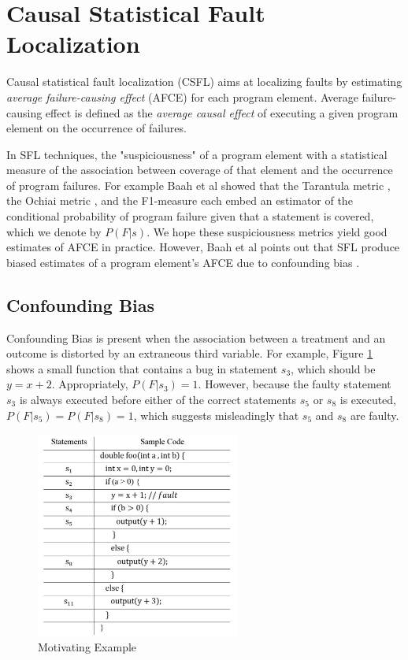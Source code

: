 \section{Causal Statistical Fault Localization}
Causal statistical fault localization (CSFL) aims at localizing faults by estimating {\it average failure-causing effect} (AFCE) for each program element. Average failure-causing effect is defined as the {\it average causal effect} \cite{pearl2000models} of executing a given program element on the occurrence of failures.  

In SFL techniques, the "suspiciousness" of a program element with a statistical measure of the association between coverage of that element and the occurrence of program failures. For example Baah et al showed \cite{baah2010causal} that the Tarantula metric \cite{jones2002visualization}, the Ochiai metric \cite{abreu2007accuracy}, and the F1-measure \cite{manning2008introduction} each embed an estimator of the conditional probability of program failure given that a statement  is covered, which we denote by $P(F|s)$.  We hope these suspiciousness metrics yield good estimates of AFCE in practice. However, Baah et al points out that SFL produce biased estimates of a program element’s AFCE due to confounding bias \cite{baah2010causal}.

\subsection{Confounding Bias}
Confounding Bias is present when the association between a treatment and an outcome is distorted by an extraneous third variable.  For example, Figure \ref{fig2.1} shows a small function that contains a bug in statement $s_3$, which should be $y=x+2$.  Appropriately, $P(F|s_3)=1$.  However, because the faulty statement $s_3$ is always executed before either of the correct statements $s_5$ or $s_8$ is executed, $P(F|s_5)=P(F|s_8)=1$, which suggests misleadingly that $s_5$ and $s_8$ are faulty.

\begin{figure}[htb!]
\vspace{0em}
\begin{center}
\includegraphics[width=0.6\textwidth]{chapter2_fig1.pdf}
\vspace {0em}\caption{Motivating Example} \label{fig2.1}
\end{center}
\vspace {0em}
\end{figure}
 

